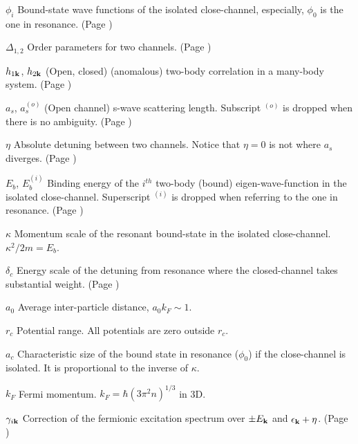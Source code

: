 \documentclass[edeposit,fullpage,prequest]{uiucthesis2009}
\begin{document}
\begin{symbollist}[0.7in]
\item[$\phi_{i}$] Bound-state wave functions of the isolated close-channel, especially, $\phi_{0}$ is the one in resonance. (Page \pageref{eq:pathInt2:phi})
\item[$\Delta_{1,2}$] Order parameters for two channels. (Page \pageref{eq:pathInt2:identity})
\item[$h_{1\mathbf{k}}$, $ h_{2\mathbf{k}}$] (Open, closed) (anomalous) two-body correlation in a many-body system. (Page \pageref{eq:pathInt2:h2})
\item[$a_{s}$, $a_{s}^{(o)}$] (Open channel) s-wave scattering length. Subscript ${}^{(o)}$ is dropped when there is no ambiguity. (Page \pageref{sec:intro:as})
\item[$\eta$] Absolute detuning between two channels. Notice that $\eta=0$ is not where $a_{s}$ diverges. (Page \pageref{eq:intro:ham})
\item[$E_{b}$, $E_{b}^{(i)}$] Binding energy of the $i^{th}$ two-body (bound) eigen-wave-function in the isolated close-channel.  Superscript ${}^{(i)}$ is dropped when referring to the one in resonance. (Page \pageref{eq:intro:sch2})
\item[$\kappa$] Momentum scale of the resonant bound-state in the isolated close-channel.  $\kappa^{2}/2m=E_{b}$.
\item[$\delta_{c}$] Energy scale of the  detuning from resonance where the closed-channel takes substantial weight. (Page \pageref{eq:intro:deltaC})
\item[$a_{0}$] Average inter-particle distance, $a_{0}k_{F}\sim1$.
\item[$r_{c}$] Potential range.  All  potentials are zero outside $r_{c}$.
\item[$a_{c}$] Characteristic size of the bound state in resonance ($\phi_{0}$) if the close-channel is isolated. It is proportional  to the inverse of $\kappa$.
\item[$k_{F}$] Fermi momentum. $k_{F}=\hbar(3\pi^{2}n)^{1/3}$ in 3D.
\item[$\gamma_{i\mathbf{k}}$] Correction of the fermionic excitation spectrum over $\pm{}E_{\mathbf{k}}$ and $\epsilon_{\mathbf{k}}+\eta$. (Page \pageref{eq:pathInt2:xiExpand})


\end{symbollist}
\end{document}
